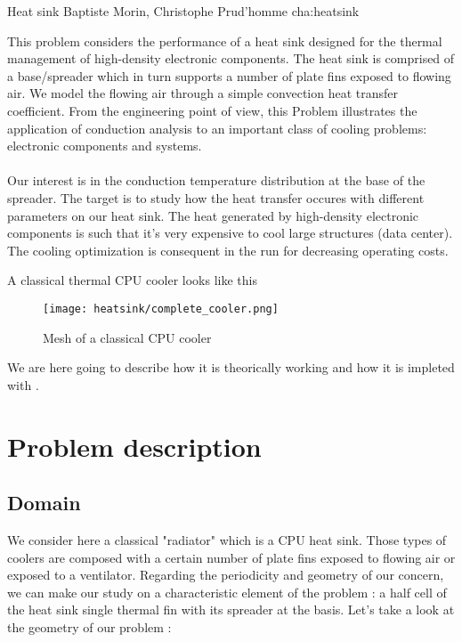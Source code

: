             {Heat sink}
            {Baptiste Morin, Christophe Prud'homme}
            {cha:heatsink}

This problem considers the performance of a heat sink designed for the thermal management of high-density electronic components. The heat sink is comprised of a base/spreader which in turn supports a number of plate fins exposed to flowing air. We model the flowing air through a simple convection heat transfer coefficient. From the engineering point of view, this Problem illustrates the application of conduction analysis to an important class of cooling problems: electronic components and systems. \\ \\
Our interest is in the conduction temperature distribution at the base of the spreader. The target is to study how the heat transfer occures with different parameters on our heat sink. The heat generated by high-density electronic components is such that it's very expensive to cool large structures (data center). The cooling optimization is consequent in the run for decreasing operating costs.

\noindent A classical thermal CPU cooler looks like this 

\begin{figure}[!h]
\centering
\texttt{[image: heatsink/complete\_cooler.png]}
\caption{Mesh of a classical CPU cooler}
\end{figure}

\noindent We are here going to describe how it is theorically working and how it is impleted with \feel. 

\section{Problem description}
\subsection{Domain}

We consider here a classical "radiator" which is a CPU heat sink. Those types of coolers are composed with a certain number of plate fins exposed to flowing air or exposed to a ventilator. Regarding the periodicity and geometry of our concern, we can make our study on a characteristic element of the problem : a half cell of the heat sink single thermal fin with its spreader at the basis. Let's take a look at the geometry of our problem :

